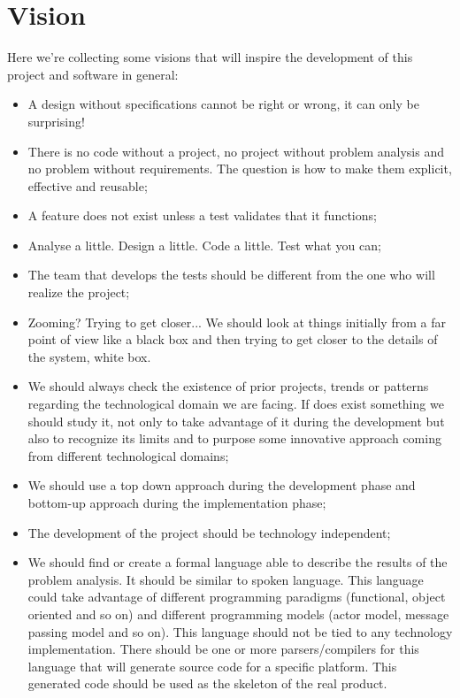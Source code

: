 \section{Vision}
Here we’re collecting some visions that will inspire the development of this project and software in general:
\begin{itemize}
	\item A design without specifications cannot be right or wrong, it can only be surprising!
	\item There is no code without a project, no project without problem analysis and no problem without requirements. The question is how to make them explicit, effective and reusable;
	\item A feature does not exist unless a test validates that it functions;
	\item Analyse a little. Design a little. Code a little. Test what you can;
	\item The team that develops the tests should be different from the one who will realize the project;
	\item Zooming? Trying to get closer... We should look at things initially from a far point of view like a black box and then trying to get closer to the details of the system, white box.
	\item We should always check the existence of prior projects, trends or patterns regarding the technological domain we are facing. If does exist something we should study it, not only to take advantage of it during the development but also to recognize its limits and to purpose some innovative approach coming from different technological domains;
	\item We should use a top down approach during the development phase and bottom-up approach during the implementation phase;
	\item The development of the project should be technology independent;
	\item We should find or create a formal language able to describe the results of the problem analysis. It should be similar to spoken language. This language could take advantage of different programming paradigms (functional, object oriented and so on) and different programming models (actor model, message passing model and so on). This language should not be tied to any technology implementation. There should be one or more parsers/compilers for this language that will generate source code for a specific platform. This generated code should be used as the skeleton of the real product.
\end{itemize}